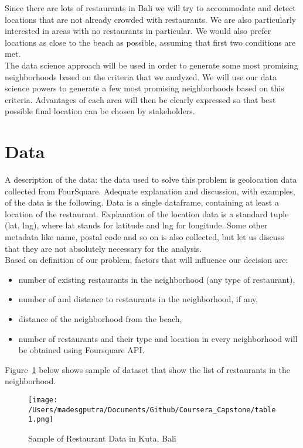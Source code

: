 \documentclass[12pt,letterpaper]{article}
\begin{document}
Since there are lots of restaurants in Bali we will try to accommodate and detect locations that are not already crowded with restaurants. We are also particularly interested in areas with no restaurants in particular. We would also prefer locations as close to the beach as possible, assuming that first two conditions are met.\\

The data science approach will be used in order to generate some most promising neighborhoods based on the criteria that we analyzed.
We will use our data science powers to generate a few most promising neighborhoods based on this criteria. Advantages of each area will then be clearly expressed so that best possible final location can be chosen by stakeholders.\\

\section{Data}
A description of the data: the data used to solve this problem is geolocation data collected from FourSquare. Adequate explanation and discussion, with examples, of the data is the following. Data is a single dataframe, containing at least a location of the restaurant. Explanation of the location data is a standard tuple (lat, lng), where lat stands for latitude and lng for longitude. Some other metadata like name, postal code and so on is also collected, but let us discuss that they are not absolutely necessary for the analysis.\\

Based on definition of our problem, factors that will influence our decision are:
\begin{itemize}
\item number of existing restaurants in the neighborhood (any type of restaurant),
\item number of and distance to restaurants in the neighborhood, if any,
\item distance of the neighborhood from the beach,
\item number of restaurants and their type and location in every neighborhood will be obtained using Foursquare API.
\end{itemize}
Figure~\ref{fig:restodata} below shows sample of dataset that show the list of restaurants in the neighborhood. 
\begin{figure}[H]
	\centering
	\texttt{[image: /Users/madesgputra/Documents/Github/Coursera\_Capstone/table1.png]} 
	\caption[Sample of Restaurant Data in Kuta, Bali]{Sample of Restaurant Data in Kuta, Bali}
	\label{fig:restodata}
\end{figure}
\end{document}
